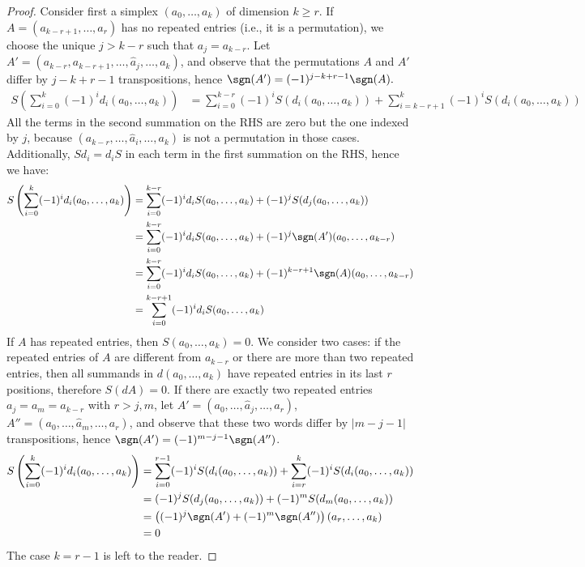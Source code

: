 \begin{proof}
	Consider first a simplex $(a_0,\ldots,a_k)$ of dimension $k\geq r$. If $A=(a_{k-r+1},\ldots,a_{r})$ has no repeated entries (i.e., it is a permutation), we choose the unique $j>k-r$ such that $a_j = a_{k-r}$. Let $A' = (a_{k-r},a_{k-r+1},\ldots,\hat{a}_j,\ldots,a_k)$, and observe that the permutations $A$ and $A'$ differ by $j-k+r-1$ transpositions, hence $\sgn(A') = (-1)^{j-k+r-1}\sgn(A).$
	\begin{align*}
		S\left(\sum_{i=0}^k (-1)^id_i (a_0,\ldots,a_k)\right)
		&= \sum_{i=0}^{k-r} (-1)^iS(d_i (a_0,\ldots,a_k)) + \sum_{i=k-r+1}^{k} (-1)^iS(d_i (a_0,\ldots,a_k))
	\end{align*}
	All the terms in the second summation on the RHS are zero but the one indexed by $j$, because $(a_{k-r},\ldots,\hat{a}_i,\ldots,a_k)$ is not a permutation in those cases. Additionally, $Sd_i = d_{i}S$ in each term in the first summation on the RHS, hence we have:
	\begin{align*}
		S\left(\sum_{i=0}^k (-1)^id_i (a_0,\ldots,a_k)\right)
		&= \sum_{i=0}^{k-r} (-1)^i d_i S(a_0,\ldots,a_k) + (-1)^j S(d_j (a_0,\ldots,a_k)) \\
		&= \sum_{i=0}^{k-r} (-1)^i d_i S(a_0,\ldots,a_k) + (-1)^{j}\sgn(A')(a_0,\ldots,a_{k-r}) \\
		&= \sum_{i=0}^{k-r} (-1)^i d_i S(a_0,\ldots,a_k) + (-1)^{k-r+1}\sgn(A)(a_0,\ldots,a_{k-r}) \\
		&= \sum_{i=0}^{k-r+1} (-1)^i d_i S(a_0,\ldots,a_k)
	\end{align*}
	If $A$ has repeated entries, then $S(a_0,\ldots,a_k) = 0$. We consider two cases: if the repeated entries of $A$ are different from $a_{k-r}$ or there are more than two repeated entries, then all summands in $d(a_0,\ldots,a_k)$ have repeated entries in its last $r$ positions, therefore $S(dA)=0$. If there are exactly two repeated entries $a_j=a_m = a_{k-r}$ with $r>j,m$, let $A' = (a_0,\ldots,\hat{a}_j,\ldots,a_{r})$, $A'' = (a_0,\ldots,\hat{a}_m,\ldots,a_{r})$, and observe that these two words differ by $|m-j-1|$ transpositions, hence $\sgn(A') = (-1)^{m-j-1}\sgn(A'')$.
	\begin{align*}
		S\left(\sum_{i=0}^k (-1)^id_i (a_0,\ldots,a_k)\right)
		&= \sum_{i=0}^{r-1} (-1)^iS(d_i (a_0,\ldots,a_k)) + \sum_{i=r}^{k} (-1)^iS(d_i (a_0,\ldots,a_k)) \\
		&= (-1)^jS(d_j (a_0,\ldots,a_k)) + (-1)^mS(d_m (a_0,\ldots,a_k)) \\
		&= \left((-1)^{j}\sgn(A') + (-1)^m\sgn(A'')\right)(a_r,\ldots,a_k)\\
		&= 0
	\end{align*}
	The case $k=r-1$ is left to the reader.
\end{proof}





